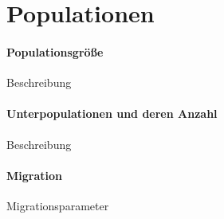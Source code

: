 \section{Populationen}\label{populations}


\paragraph{Populationsgröße}
Beschreibung

\paragraph{Unterpopulationen und deren Anzahl}
Beschreibung

\paragraph{Migration}
Migrationsparameter


